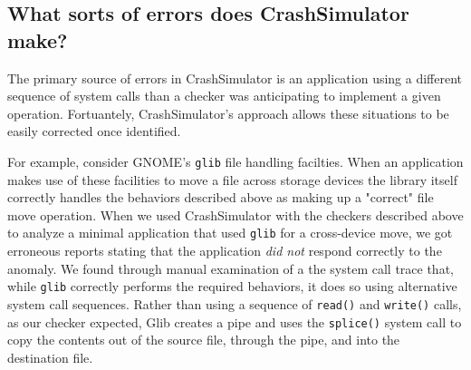         
\subsection{What sorts of errors does CrashSimulator make?}
\label{sec-sorts-errors}
%
The primary source of %
errors in CrashSimulator is an
application using a different sequence of system calls than a checker was
anticipating to implement a given operation.  Fortuantely, CrashSimulator's
approach allows these situations to be easily corrected once identified.


For example, consider GNOME's {\tt glib} file handling facilties.  When an
application makes use of these facilities to move a file across storage devices
the library itself correctly handles the behaviors described above as
making up a "correct" file move operation.  When we used CrashSimulator 
with the checkers described above to
analyze a minimal application that used {\tt glib} for a cross-device move,
we got erroneous reports stating that the application {\em did not} respond
correctly to the anomaly.
We found through manual examination of a
the system call trace that, while {\tt glib} correctly performs
the required behaviors, it does so using alternative system call sequences. 
Rather than using a sequence of
{\tt read()} and {\tt write()} calls, 
as our checker expected,
Glib creates a pipe and uses the
{\tt splice()} system call to copy the contents out of the source file, through
the pipe, and into the destination file.

